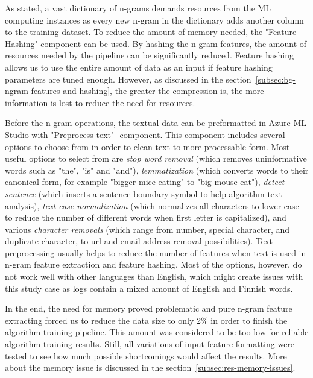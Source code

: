 As stated,
a vast dictionary of n-grams demands resources from the ML computing instances
as every new n-gram in the dictionary adds another column to the training dataset.
To reduce the amount of memory needed,
the "Feature Hashing" component can be used.
By hashing the n-gram features,
the amount of resources needed by the pipeline
can be significantly reduced.
Feature hashing allows us to use the entire amount of data as an input
if feature hashing parameters are tuned enough.
However,
as discussed in the section~\ref{subsec:bg-ngram-features-and-hashing},
the greater the compression is,
the more information is lost
to reduce the need for resources.

Before the n-gram operations,
the textual data can be preformatted in Azure ML Studio
with "Preprocess text" -component.
This component includes several options to choose from
in order to clean text to more processable form.
Most useful options to select from are
\textit{stop word removal} (which removes uninformative words such as "the", "is" and "and"),
\textit{lemmatization} (which converts words to their canonical form,
for example "bigger mice eating" to "big mouse eat"),
\textit{detect sentence} (which inserts a sentence boundary symbol
to help algorithm text analysis),
\textit{text case normalization} (which normalizes all characters to lower case
to reduce the number of different words when first letter is capitalized),
and various \textit{character removals} (which range from number, special character, and duplicate character,
to url and email address removal possibilities).
Text preprocessing usually helps to reduce the number of features
when text is used in n-gram feature extraction and feature hashing.
Most of the options, however,
do not work well with other languages than English,
which might create issues with this study case
as logs contain a mixed amount of English and Finnish words.~\cite{azure2021preprocess}

In the end,
the need for memory proved problematic
and pure n-gram feature extracting forced us
to reduce the data size to only 2\%
in order to finish the algorithm training pipeline.
This amount was considered to be too low
for reliable algorithm training results.
Still,
all variations of input feature formatting were tested
to see how much possible shortcomings would affect the results.
More about the memory issue is discussed
in the section~\ref{subsec:res-memory-issues}.




